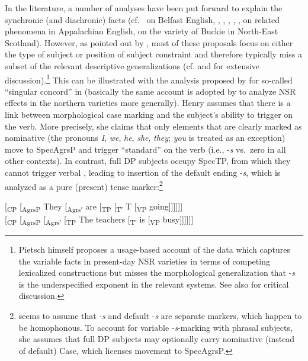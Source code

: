 \documentclass[output=paper]{langsci/langscibook}
\begin{document}
In the literature, a number of analyses have been put forward to explain the
synchronic (and diachronic) facts (cf.\ \citealt{Henry:1995} on Belfast
English, \citealt{Boerjarschapman:1998}, \citealt{Hudson:1999},
\citealt{Pietsch:2005a}, \citealt{deHaas2008,deHaas:2011},
\citealt{deHaasandvanKemenade:2015}, \citealt{TortoraDenDikken:2010} on related
phenomena in Appalachian English, \citealt{AdgerSmith2010} on the variety of
Buckie in North-East Scotland).  However, as pointed out by
\textcite[180]{Pietsch:2005a}, most of these proposals focus on either the type
of subject or position of subject constraint and therefore typically miss a
subset of the relevant descriptive generalizations (cf.
\citealt{Pietsch:2005a} and \citealt{deHaas:2011} for extensive
discussion).\footnote{Pietsch himself proposes a usage-based account of the
    data which captures the variable  facts in present-day \gls{NSR}
    varieties in terms of competing lexicalized constructions but misses the
morphological generalization that -\emph{s} is the underspecified exponent in
the relevant systems. See also \textcite[1122f.]{AdgerSmith2010} for critical
discussion.} This can be illustrated with the analysis proposed by
\textcite{Henry:1995} for so-called ``singular concord'' in 
(basically the same account is adopted by \citealt{deHaas2008} to analyze
\gls{NSR} effects in the northern varieties more generally). Henry assumes that
there is a link between morphological case marking and the subject's ability to
trigger  on the verb. More precisely, she claims that only elements
that are clearly marked as nominative (the pronouns \emph{I}, \emph{we},
\emph{he}, \emph{she}, \emph{they}; \emph{you} is treated as an exception) move
to SpecAgrsP and trigger ``standard''  on the verb (i.e., \Tsg{}
-\emph{s} vs.\ zero in all other contexts). In contrast, full DP subjects
occupy SpecTP, from which they cannot trigger verbal , leading to
insertion of the default ending -\emph{s}, which is analyzed as a pure
(present) tense marker:\footnote{\citeauthor{Henry:1995} seems to assume that
    \Tsg{} -\emph{s} and default -\emph{s} are separate markers, which happen
    to be homophonous.  To account for variable -\emph{s}-marking with phrasal
    subjects, she assumes that full DP subjects may optionally carry nominative
    (instead of default) Case, which licenses movement to SpecAgrsP.}

\ea
	\ea \mbox [\textsubscript{CP} [\textsubscript{AgrsP} They [\textsubscript{Agrsʹ} are [\textsubscript{TP} [\textsubscript{Tʹ} T [\textsubscript{VP} going]]]]]]\\
	\ex \mbox [\textsubscript{CP} [\textsubscript{AgrsP} [\textsubscript{Agrsʹ} [\textsubscript{TP} The teachers [\textsubscript{Tʹ} is [\textsubscript{VP} busy]]]]]]\\
    \z
\z
\end{document}
